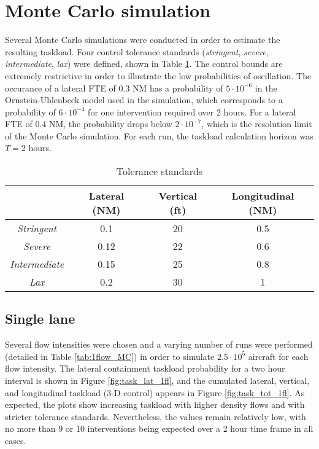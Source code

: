 \documentclass[conference]{IEEEtran}
\begin{document}
\section{Monte Carlo simulation}
\label{sec:sim}

Several Monte Carlo simulations were conducted in order to estimate the resulting taskload. Four control tolerance standards (\emph{stringent}, \emph{severe}, \emph{intermediate}, \emph{lax}) were defined, shown in Table \ref{tab:1flow_tol}. The control bounds are extremely restrictive in order to illustrate the low probabilities of oscillation. The occurance of a lateral FTE of 0.3 NM has a probability of $5\cdot10^{-6}$ in the Ornstein-Uhlenbeck model used in the simulation, which corresponds to a probability of $6\cdot10^{-4}$ for one intervention required over 2 hours. For a lateral FTE of 0.4 NM, the probability drops below $2\cdot10^{-7}$, which is the resolution limit of the Monte Carlo simulation. For each run, the taskload calculation horizon was $T=2$ hours.

\begin{table}
\caption{Tolerance standards}
\label{tab:1flow_tol}
\centering
\begin{tabular}{|c|c|c|c|}
\hline\hline 
 & Lateral (NM) & Vertical (ft) & Longitudinal (NM) \bigstrut \\ \hline\hline
\emph{Stringent} & 0.1 &  20 & 0.5 \bigstrut \\ \hline
\emph{Severe}& 0.12 & 22 & 0.6  \bigstrut \\ \hline
\emph{Intermediate}& 0.15 & 25 & 0.8 \bigstrut \\ \hline
\emph{Lax} & 0.2 & 30 & 1 \bigstrut\\ \hline \hline
\end{tabular}
\end{table}

\subsection{Single lane}

Several flow intensities were chosen and a varying number of runs were performed (detailed in Table \ref{tab:1flow_MC}) in order to simulate $2.5\cdot10^5$ aircraft for each flow intensity. The lateral containment taskload probability for a two hour interval is shown in Figure \ref{fig:task_lat_1fl}, and the cumulated lateral, vertical, and longitudinal taskload (3-D control) appears in Figure \ref{fig:task_tot_1fl}. As expected, the plots show increasing taskload with higher density flows and with stricter tolerance standards. Nevertheless, the values remain relatively low, with no more than 9 or 10 interventions being expected over a 2 hour time frame in all cases. 
\end{document}
